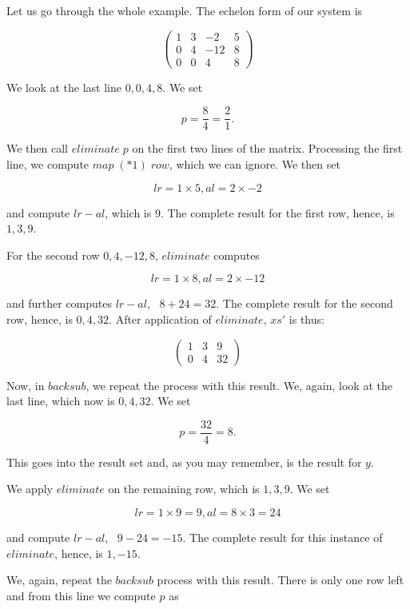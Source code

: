 \documentclass[tikz]{scrreprt}
\newcommand{\Varid}[1]{\mathit{#1}}
\begin{document}
Let us go through the whole example.
The echelon form of our system is

\[
\begin{pmatrix}
1 & 3 & -2  & 5\\
0 & 4 & -12 & 8\\
0 & 0 &   4 & 8
\end{pmatrix}
\]

We look at the last line $0,0,4,8$.
We set 

\[
p = \frac{8}{4} = \frac{2}{1}.
\]

We then call \ensuremath{\Varid{eliminate}\;\Varid{p}} on the first two lines
of the matrix. Processing the first line,
we compute \ensuremath{\Varid{map}\;(\mathbin{*}\mathrm{1})\;\Varid{row}}, which we can ignore.
We then set

\[
lr = 1\times 5,
al = 2\times -2
\]

and compute $lr - al$, which is 9.
The complete result for the first row,
hence, is $1,3,9$.

For the second row $0,4,-12,8$, \ensuremath{\Varid{eliminate}} computes

\[
lr = 1\times 8,
al = 2\times -12
\] 

and further computes $lr - al$, \ie\ $8 + 24 = 32$.
The complete result for the second row, hence, is
$0,4,32$. After application of \ensuremath{\Varid{eliminate}}, \ensuremath{\Varid{xs'}}
is thus:

\[
\begin{pmatrix}
1 & 3 & 9\\
0 & 4 & 32
\end{pmatrix}
\]

Now, in \ensuremath{\Varid{backsub}}, we repeat the process with this result.
We, again, look at the last line, which now is $0,4,32$.
We set 

\[
p = \frac{32}{4} = 8.
\]

This goes into the result set and, as you may remember,
is the result for $y$.

We apply \ensuremath{\Varid{eliminate}} on the remaining row, which is $1,3,9$.
We set

\[
lr = 1\times 9 = 9,
al = 8\times 3 = 24
\]

and compute $lr - al$, \ie\ $9-24=-15$.
The complete result for this instance of \ensuremath{\Varid{eliminate}}, hence, is
$1,-15$.

We, again, repeat the \ensuremath{\Varid{backsub}} process with this result.
There is only one row left and from this line we compute
$p$ as 
\end{document}
